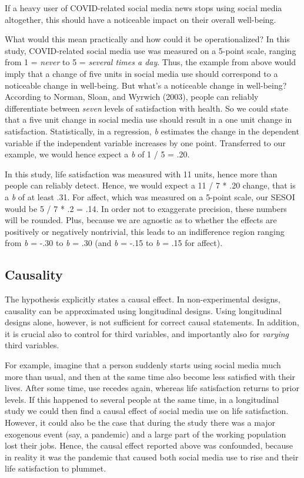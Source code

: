 \documentclass[
  english,
  man,floatsintext]{apa6}
\begin{document}
If a heavy user of COVID-related social media news stops using social media altogether, this should have a noticeable impact on their overall well-being.

What would this mean practically and how could it be operationalized?
In this study, COVID-related social media use was measured on a 5-point scale, ranging from 1 = \emph{never} to 5 = \emph{several times a day}.
Thus, the example from above would imply that a change of five units in social media use should correspond to a noticeable change in well-being.
But what's a noticeable change in well-being?
According to Norman, Sloan, and Wyrwich (2003), people can reliably differentiate between \emph{seven} levels of satisfaction with health.
So we could state that a five unit change in social media use should result in a one unit change in satisfaction.
Statistically, in a regression, \emph{b} estimates the change in the dependent variable if the independent variable increases by one point.
Transferred to our example, we would hence expect a \emph{b} of 1 / 5 = .20.

In this study, life satisfaction was measured with 11 units, hence more than people can reliably detect.
Hence, we would expect a 11 / 7 * .20 change, that is a \emph{b} of at least .31.
For affect, which was measured on a 5-point scale, our SESOI would be 5 / 7 * .2 = .14.
In order not to exaggerate precision, these numbers will be rounded.
Plus, because we are agnostic as to whether the effects are positively or negatively nontrivial, this leads to an indifference region ranging from \emph{b} = -.30 to \emph{b} = .30 (and \emph{b} = -.15 to \emph{b} = .15 for affect).

\hypertarget{causality}{%
\subsection{Causality}\label{causality}}

The hypothesis explicitly states a causal effect.
In non-experimental designs, causality can be approximated using longitudinal designs.
Using longitudinal designs alone, however, is not sufficient for correct causal statements.
In addition, it is crucial also to control for third variables, and importantly also for \emph{varying} third variables.

For example, imagine that a person suddenly starts using social media much more than usual, and then at the same time also become less satisfied with their lives.
After some time, use recedes again, whereas life satisfaction returns to prior levels.
If this happened to several people at the same time, in a longitudinal study we could then find a causal effect of social media use on life satisfaction.
However, it could also be the case that during the study there was a major exogenous event (say, a pandemic) and a large part of the working population lost their jobs.
Hence, the causal effect reported above was confounded, because in reality it was the pandemic that caused both social media use to rise and their life satisfaction to plummet.
\end{document}
